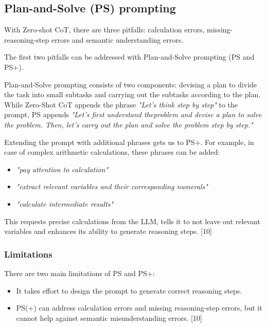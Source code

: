 \documentclass{article}
\begin{document}
\subsection{Plan-and-Solve (PS) prompting}
With Zero-shot CoT, there are three pitfalls: calculation errors, missing-reasoning-step errors and semantic understanding errors. 

The first two pitfalls can be addressed with Plan-and-Solve prompting (PS and PS+).
\newline

Plan-and-Solve prompting consists of two components: devising a plan to divide the task into small subtasks and carrying out the subtasks according to the plan. While Zero-Shot CoT appends the phrase \textit{"Let's think step by step"} to the prompt, PS appends \textit{"Let’s first understand theproblem and devise a plan to solve the problem. Then, let’s carry out the plan and solve the problem step by step." }
\newline

Extending the prompt with additional phrases gets us to PS+. For example, in case of complex arithmetic calculations, these phrases can be added:
\begin{itemize}
    \item \textit{"pay attention to calculation"}
    \item \textit{"extract relevant variables and their corresponding numerals"}
    \item \textit{"calculate intermediate results"}
\end{itemize}

This requests precise calculations from the LLM, tells it to not leave out relevant variables and enhances its ability to generate reasoning steps. [10]
\newline

\subsubsection{Limitations}

There are two main limitations of PS and PS+:
\begin{itemize}
    \item It takes effort to design the prompt to generate correct reasoning steps.
    \item PS(+) can address calculation errors and missing reasoning-step errors, but it cannot help against semantic misunderstanding errors. [10] 
\end{itemize}
\end{document}
